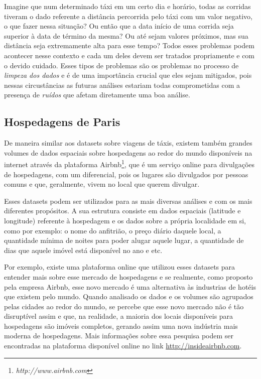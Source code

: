 Imagine que num determinado táxi em um certo dia e horário, todas as corridas tiveram o dado referente a distância percorrida pelo táxi com um valor negativo, o que fazer nessa situação? Ou então que a data início de uma corrida seja superior à data de término da mesma? Ou até sejam valores próximos, mas sua distância seja extremamente alta para esse tempo? Todos esses problemas podem acontecer nesse contexto e cada um deles devem ser tratados propriamente e com o devido cuidado. Esses tipos de problemas são os problemas no processo de \textit{limpeza dos dados} e é de uma importância crucial que eles sejam mitigados, pois nessas circustâncias as futuras análises estariam todas comprometidas com a presença de \textit{ruídos} que afetam diretamente uma boa análise.

\subsection{Hospedagens de Paris}

De maneira similar aos datasets sobre viagens de táxis, existem também grandes volumes de dados espaciais sobre hospedagens ao redor do mundo disponíveis na internet através da plataforma Airbnb\footnote{\it http://www.airbnb.com}, que é um serviço online para divulgações de hospedagens, com um diferencial, pois os lugares são divulgados por pessoas comuns e que, geralmente, vivem no local que querem divulgar.

Esses datasets podem ser utilizados para as mais diversas análises e com os mais diferentes propósitos. A sua estrutura consiste em dados espaciais (latitude e longitude) referente à hospedagem e os dados sobre a própria localidade em si, como por exemplo: o nome do anfitrião, o preço diário daquele local, a quantidade mínima de noites para poder alugar aquele lugar, a quantidade de dias que aquele imóvel está disponível no ano e etc.

Por exemplo, existe uma plataforma online que utilizou esses datasets para entender mais sobre esse mercado de hospedagens e se realmente, como proposto pela empresa Airbnb, esse novo mercado é uma alternativa às industrias de hotéis que existem pelo mundo. Quando analisado os dados e os volumes são agrupados pelas cidades ao redor do mundo, se percebe que esse novo mercado não é tão disruptível assim e que, na realidade, a maioria dos locais disponíveis para hospedagens são imóveis completos, gerando assim uma nova indústria mais moderna de hospedagens. Mais informações sobre essa pesquisa podem ser encontradas na plataforma disponível online no link \url{http://insideairbnb.com}.

